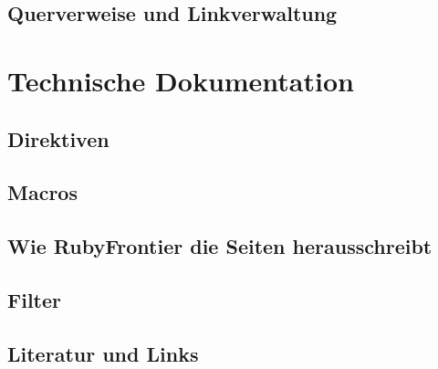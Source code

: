 \documentclass[11pt]{report}
\begin{document}
\chapter{Querverweise und Linkverwaltung}
\label{sec-2-14}
\part{Technische Dokumentation}
\label{sec-3}
\chapter{Direktiven}
\label{sec-3-1}
\chapter{Macros}
\label{sec-3-2}
\chapter{Wie RubyFrontier die Seiten herausschreibt}
\label{sec-3-3}
\chapter{Filter}
\label{sec-3-4}
\chapter{Literatur und Links}
\label{sec-3-5}
\end{document}
